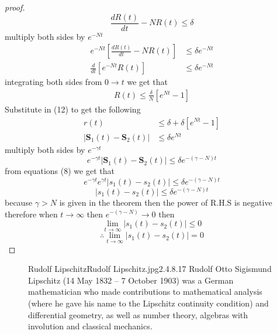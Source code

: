 \documentclass[]{article}
\begin{document}
\begin{proof}[proof]
\begin{equation}
    \frac{dR(t)}{dt} - NR(t) \leq \delta 
\end{equation}
multiply both sides by $e^{-Nt}$
\begin{align*}
    e^{-Nt}\left[\frac{dR(t)}{dt} - NR(t)\right] &\leq \delta e^{-Nt}    
    \\
    \frac{d}{dt}\left[e^{-Nt}R(t)\right] &\leq \delta e^{-Nt}    
\end{align*}
integrating both sides from $0 \to t$ we get that 
\begin{align*}
    R(t) \leq \frac{\delta}{N}\left[e^{Nt}-1\right]
\end{align*}
Substitute in (12) to get the following
\begin{align*}
    r(t) &\leq \delta + \delta\left[e^{Nt}-1\right]
    \\
    |\mathbf{S}_1(t) - \mathbf{S}_2(t)|  &\leq \delta e^{Nt}
\end{align*}
multiply both sides by $e^{-\gamma t}$
\[
    e^{-\gamma t}|\mathbf{S}_1(t) - \mathbf{S}_2(t)|  \leq \delta e^{-(\gamma-N)t}
\]
from equations (8) we get that 
\[
    e^{-\gamma t}e^{\gamma t}|s_1(t) - s_2(t)|  \leq \delta e^{-(\gamma-N)t}
\]
\[
    |s_1(t) - s_2(t)|  \leq \delta e^{-(\gamma-N)t}
\]
because $\gamma > N$ is given in the theorem then the power of R.H.S is negative therefore 
when $t \to \infty$ then $e^{-(\gamma-N)} \to 0$ then
\[
\lim_{t \to \infty} |s_1(t) - s_2(t)| \leq 0
\]
\[
\therefore \lim_{t \to \infty} |s_1(t) - s_2(t)| = 0
\]
\end{proof}
\begin{figure}[b]
    \begin{enrichment}{Rudolf Lipschitz}{Rudolf Lipschitz.jpg}{2.4}{.8}{.17}
        Rudolf Otto Sigismund Lipschitz (14 May 1832 – 7 October 1903) 
        was a German mathematician who made contributions to mathematical analysis 
        (where he gave his name to the Lipschitz continuity condition) and differential geometry, as well as number theory, algebras with involution and classical mechanics.
    \end{enrichment}    
\end{figure}
\setcounter{equation}{0}
\newpage
\end{document}
